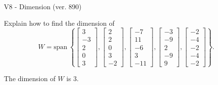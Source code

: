 \begin{exercise}
  \begin{exerciseTitle}V8 - Dimension (ver. 890)\end{exerciseTitle}
  \begin{exerciseStatement}
    Explain how to find the dimension of 
\[W=\mathrm{span}\ \left\{\left[\begin{array}{r}
3 \\
-3 \\
2 \\
0 \\
3
\end{array}\right] , \left[\begin{array}{r}
2 \\
2 \\
0 \\
3 \\
-2
\end{array}\right] , \left[\begin{array}{r}
-7 \\
11 \\
-6 \\
3 \\
-11
\end{array}\right] , \left[\begin{array}{r}
-3 \\
-9 \\
2 \\
-9 \\
9
\end{array}\right] , \left[\begin{array}{r}
-2 \\
-4 \\
-2 \\
-4 \\
-2
\end{array}\right]\right\}.\]



  \end{exerciseStatement}
  \begin{exerciseAnswer}
   The dimension of \(W\) is  \(3\).
  


  \end{exerciseAnswer}
\end{exercise}